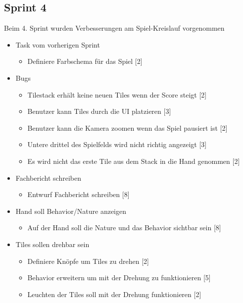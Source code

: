 \documentclass[../main.tex]{subfiles}
\begin{document}
	\newpage
	\subsection{Sprint 4}
	
	\par Beim 4. Sprint wurden Verbesserungen am Spiel-Kreislauf vorgenommen
	
	\begin{itemize}
		\item Task vom vorherigen Sprint
		\begin{itemize}
			\item Definiere Farbschema für das Spiel [2]
		\end{itemize}
	
		\item Bugs
		\begin{itemize}
			\item Tilestack erhält keine neuen Tiles wenn der Score steigt [2]
			\item Benutzer kann Tiles durch die UI platzieren [3]
			\item Benutzer kann die Kamera zoomen wenn das Spiel pausiert ist [2]
			\item Untere drittel des Spielfelds wird nicht richtig angezeigt [3]
			\item Es wird nicht das erste Tile aus dem Stack in die Hand genommen [2]
		\end{itemize}
	
		\item Fachbericht schreiben
		\begin{itemize}
			\item Entwurf Fachbericht schreiben [8]
		\end{itemize}
	
		\item Hand soll Behavior/Nature anzeigen
		\begin{itemize}
			\item Auf der Hand soll die Nature und das Behavior sichtbar sein [8]
		\end{itemize}
	
		\item Tiles sollen drehbar sein
		\begin{itemize}
			\item Definiere Knöpfe um Tiles zu drehen [2]
			\item Behavior erweitern um mit der Drehung zu funktionieren [5]
			\item Leuchten der Tiles soll mit der Drehung funktionieren [2]
		\end{itemize}
	

\end{itemize}
\end{document}
